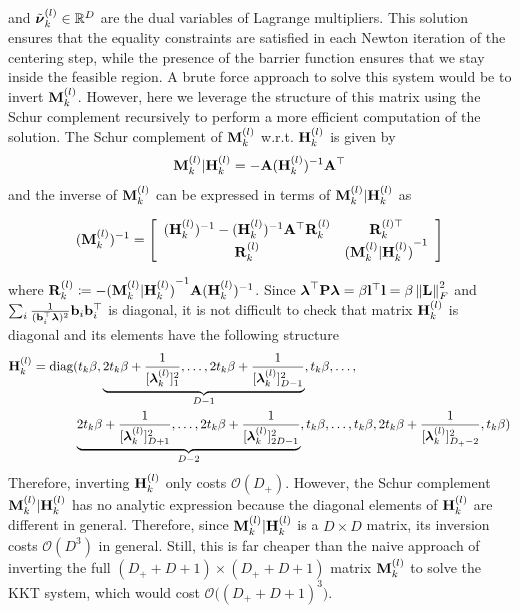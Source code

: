 and $\tilde{\boldsymbol{\nu}}_k^{(l)}\in\mathbb{R}^{D}$ are the dual variables of Lagrange multipliers. This solution ensures that the equality constraints are satisfied in each Newton iteration of the centering step, while the presence of the barrier function ensures that we stay inside the feasible region. A brute force approach to solve this system would be to invert $\mathbf{M}_k^{(l)}$. However, here we leverage the structure of this matrix using the Schur complement recursively to perform a more efficient computation of the solution. The Schur complement of $\mathbf{M}_k^{(l)}$ w.r.t. $\mathbf{H}_k^{(l)}$ is given by
\begin{equation}
	\mathbf{M}_k^{(l)}|\mathbf{H}_k^{(l)} = -\mathbf{A}(\mathbf{H}_k^{(l)})^{-1}\mathbf{A}^\top
\end{equation}
and the inverse of $\mathbf{M}_k^{(l)}$ can be expressed in terms of $\mathbf{M}_k^{(l)}|\mathbf{H}_k^{(l)}$ as
\begin{small}
	\begin{equation}\label{eq:Minv}
		(\mathbf{M}_k^{(l)})^{-1} = \left[
		\begin{array}{cc}
			(\mathbf{H}_k^{(l)})^{-1} - (\mathbf{H}_k^{(l)})^{-1}\mathbf{A}^\top\mathbf{R}_k^{(l)}  & \mathbf{R}_k^{(l)\top} \\
			\mathbf{R}_k^{(l)} & {(\mathbf{M}_k^{(l)}|\mathbf{H}_k^{(l)})}^{-1}
		\end{array}
		\right]
	\end{equation}
\end{small}%
where $\mathbf{R}_k^{(l)}\coloneqq -{(\mathbf{M}_k^{(l)}|\mathbf{H}_k^{(l)})}^{-1}\mathbf{A}(\mathbf{H}_k^{(l)})^{-1}$. Since $\boldsymbol{\lambda}^\top \mathbf{P} \boldsymbol{\lambda}= \beta \mathbf{l}^\top \mathbf{l} = \beta \left\|\mathbf{L}\right\|_F^2$ and $\sum_i\frac{1}{(\mathbf{b}_i^\top\boldsymbol{\lambda})^2}\mathbf{b}_i\mathbf{b}_i^\top$ is diagonal, it is not difficult to check that matrix $\mathbf{H}_k^{(l)}$ is diagonal and its elements have the following structure
\begin{align}
	&\mathbf{H}_k^{(l)}=\text{diag}(t_k\beta, \underbrace{2t_k\beta+\frac{1}{[\boldsymbol{\lambda}_k^{(l)}]_1^2},\ldots,2t_k\beta+\frac{1}{[\boldsymbol{\lambda}_k^{(l)}]_{D-1}^2}}_{D-1},t_k\beta,\ldots, \label{eq:ipm_delta} \\
	&\hspace{1.8cm}\underbrace{2t_k\beta+\frac{1}{[\boldsymbol{\lambda}_k^{(l)}]_{D+1}^2},\ldots,2t_k\beta+\frac{1}{[\boldsymbol{\lambda}_k^{(l)}]_{2D-1}^2}}_{D-2},t_k\beta,\ldots, t_k\beta,2t_k\beta+\frac{1}{[\boldsymbol{\lambda}_k^{(l)}]_{D_+-2}^2},t_k\beta) \nonumber
\end{align}
Therefore, inverting $\mathbf{H}_k^{(l)}$ only costs $\mathcal{O}(D_+)$. However, the Schur complement $\mathbf{M}_k^{(l)}|\mathbf{H}_k^{(l)}$ has no analytic expression because the diagonal elements of $\mathbf{H}_k^{(l)}$ are different in general. Therefore, since $\mathbf{M}_k^{(l)}|\mathbf{H}_k^{(l)}$ is a $D\times D$ matrix, its inversion costs $\mathcal{O}(D^3)$ in general. Still, this is far cheaper than the naive approach of inverting the full $(D_+ + D + 1)\times(D_+ + D + 1)$ matrix $\mathbf{M}_k^{(l)}$ to solve the KKT system, which would cost $\mathcal{O}\big((D_+ + D + 1)^3\big)$. 

